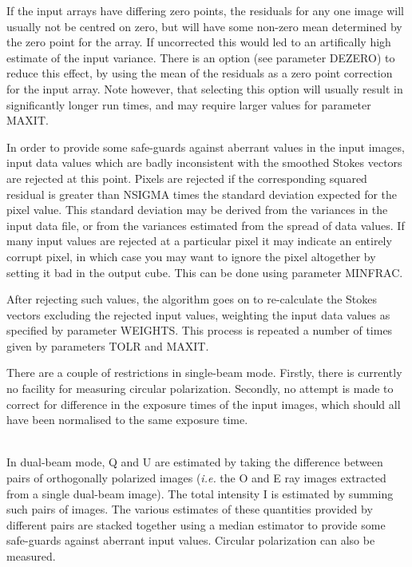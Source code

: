 \documentclass[twoside,11pt]{article}
\renewcommand{\_}{\texttt{\symbol{95}}}
\newcommand{\sstdiytopic}[2]{\item[{\hspace{-0.35em}#1\hspace{-0.35em}:}]
\mbox{} \\[1.3ex] #2}
\newcommand{\sstdiytopic}[2]{\item[{#1}] #2 }
\begin{document}
{{      If the input arrays have differing zero points, the residuals
      for any one image will usually not be centred on zero, but will
      have some non-zero mean determined by the zero point for the
      array. If uncorrected this would led to an artifically high
      estimate of the input variance. There is an option (see parameter 
      DEZERO) to reduce this effect, by using the mean of the residuals 
      as a zero point correction for the input array. Note however, that
      selecting this option will usually result in significantly
      longer run times, and may require larger values for parameter
      MAXIT.
      
      In order to provide some safe-guards against aberrant values in
      the input images, input data values which are badly inconsistent
      with the smoothed Stokes vectors are rejected at this point. Pixels
      are rejected if the corresponding squared residual is greater than
      NSIGMA times the standard deviation expected for the pixel value.
      This standard deviation may be derived from the variances in the
      input data file, or from the variances estimated from the spread
      of data values. If many input values are rejected at a particular
      pixel it may indicate an entirely corrupt pixel, in which case you
      may want to ignore the pixel altogether by setting it bad in the
      output cube. This can be done using parameter MINFRAC.

      After rejecting such values, the algorithm goes on to re-calculate
      the Stokes vectors excluding the rejected input values, weighting
      the input data values as specified by parameter WEIGHTS. This
      process is repeated a number of times given by parameters TOLR
      and MAXIT.

      There are a couple of restrictions in single-beam mode. Firstly,
      there is currently no facility for measuring circular
      polarization. Secondly, no attempt is made to correct for
      difference in the exposure times of the input images, which
      should all have been normalised to the same exposure time.
   }
   \sstdiytopic{
      The Dual-beam Algorithm
   }{
      In dual-beam mode, Q and U are estimated by taking the difference
      between pairs of orthogonally polarized images (\emph{i.e.} the O and E
      ray images extracted from a single dual-beam image). The total
      intensity I is estimated by summing such pairs of images. The
      various estimates of these quantities provided by different pairs
      are stacked together using a median estimator to provide some
      safe-guards against aberrant input values. Circular polarization
      can also be measured.

}}
\end{document}
